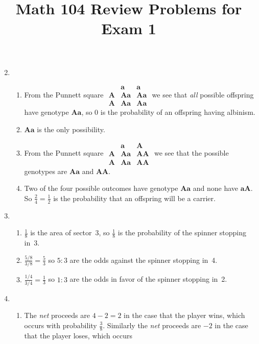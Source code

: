 \documentclass[12pt]{article}
\author{}\date{}
\title{Math 104 Review Problems for Exam 1}\author{}
\begin{document}
\maketitle
\pagestyle{empty}
\begin{enumerate}
\setcounter{enumi}{1}
\item\begin{enumerate}\item From the Punnett square
$\begin{array}{c|cc}
&\mathbold{a}&\mathbold{a}\\\hline
\mathbold{A}&\mathbold{Aa}&\mathbold{Aa}\\
\mathbold{A}&\mathbold{Aa}&\mathbold{Aa}\end{array}$
we see that {\em all} possible offspring have
genotype $\mathbold{Aa}$, so $0$ is the probability
of an offspring having albinism.
\item $\mathbold{Aa}$ is the only possibility.
\item From the Punnett square
$\begin{array}{c|cc}
&\mathbold{a}&\mathbold{A}\\\hline
\mathbold{A}&\mathbold{Aa}&\mathbold{AA}\\
\mathbold{A}&\mathbold{Aa}&\mathbold{AA}\end{array}$
we see that the possible genotypes are
$\mathbold{Aa}$ and $\mathbold{AA}$.
\item Two of the four possible outcomes have genotype
$\mathbold{Aa}$ and none have
$\mathbold{aA}$. So $\frac{2}{4}=\frac{1}{2}$ is the probability
that an offspring will be a carrier.
\end{enumerate}
\item\begin{enumerate}
\item $\frac{1}{8}$ is the area of sector~3, so $\frac{1}{8}$
is the probability of the spinner stopping in~3.
\item $\frac{5/8}{3/8}=\frac{5}{3}$ so $5:3$ are the odds
against the spinner stopping in~4.
\item $\frac{1/4}{3/4}=\frac{1}{3}$ so $1:3$ are the odds
in favor of the spinner stopping in~2.
\end{enumerate}
\item\begin{enumerate}\item The {\em net} proceeds
are $4-2=2$ in the case that the player wins, which occurs
with probability $\frac{3}{8}$. Similarly
the {\em net} proceeds are $-2$ in the case that the player loses, which occurs

\end{enumerate}
\end{enumerate}
\end{document}
